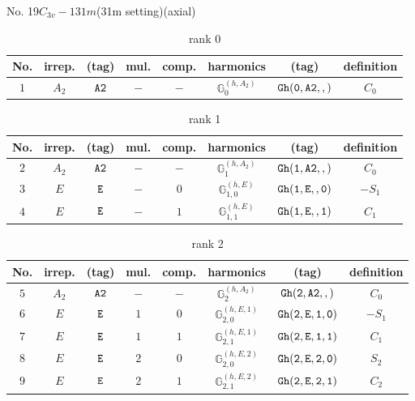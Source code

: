 \documentclass[fleqn,8pt]{jsarticle}
\begin{document}
\setcounter{MaxMatrixCols}{16}

\begin{center}
\LARGE
No. 19\quad$C_{3v}-1$\quad$31m$\quad(31m setting)\quad[ trigonal ] (axial)
\end{center}
\begin{table}[ht!]
\begin{center}
\caption{rank 0}
\renewcommand{\arraystretch}{1.3}
\begin{tabular}{cccccccc} \hline \hline
No. & irrep. & (tag) & mul. & comp. & harmonics & (tag) & definition \\ \hline
$ 1 $ & $ A_{2} $ & $ {\tt A2} $ & $ - $ & $ - $ & $ \mathbb{G}_{0}^{(h,A_{2})} $ & $ {\tt Gh(0,A2,,)} $ & $ C_{0} $ \\
 \hline \hline
\end{tabular}
\end{center}
\end{table}
\begin{table}[ht!]
\begin{center}
\caption{rank 1}
\renewcommand{\arraystretch}{1.3}
\begin{tabular}{cccccccc} \hline \hline
No. & irrep. & (tag) & mul. & comp. & harmonics & (tag) & definition \\ \hline
$ 2 $ & $ A_{2} $ & $ {\tt A2} $ & $ - $ & $ - $ & $ \mathbb{G}_{1}^{(h,A_{2})} $ & $ {\tt Gh(1,A2,,)} $ & $ C_{0} $ \\
$ 3 $ & $ E $ & $ {\tt E} $ & $ - $ & $ 0 $ & $ \mathbb{G}_{1,0}^{(h,E)} $ & $ {\tt Gh(1,E,,0)} $ & $ - S_{1} $ \\
$ 4 $ & $ E $ & $ {\tt E} $ & $ - $ & $ 1 $ & $ \mathbb{G}_{1,1}^{(h,E)} $ & $ {\tt Gh(1,E,,1)} $ & $ C_{1} $ \\
 \hline \hline
\end{tabular}
\end{center}
\end{table}
\begin{table}[ht!]
\begin{center}
\caption{rank 2}
\renewcommand{\arraystretch}{1.3}
\begin{tabular}{cccccccc} \hline \hline
No. & irrep. & (tag) & mul. & comp. & harmonics & (tag) & definition \\ \hline
$ 5 $ & $ A_{2} $ & $ {\tt A2} $ & $ - $ & $ - $ & $ \mathbb{G}_{2}^{(h,A_{2})} $ & $ {\tt Gh(2,A2,,)} $ & $ C_{0} $ \\
$ 6 $ & $ E $ & $ {\tt E} $ & $ 1 $ & $ 0 $ & $ \mathbb{G}_{2,0}^{(h,E,1)} $ & $ {\tt Gh(2,E,1,0)} $ & $ - S_{1} $ \\
$ 7 $ & $ E $ & $ {\tt E} $ & $ 1 $ & $ 1 $ & $ \mathbb{G}_{2,1}^{(h,E,1)} $ & $ {\tt Gh(2,E,1,1)} $ & $ C_{1} $ \\
$ 8 $ & $ E $ & $ {\tt E} $ & $ 2 $ & $ 0 $ & $ \mathbb{G}_{2,0}^{(h,E,2)} $ & $ {\tt Gh(2,E,2,0)} $ & $ S_{2} $ \\
$ 9 $ & $ E $ & $ {\tt E} $ & $ 2 $ & $ 1 $ & $ \mathbb{G}_{2,1}^{(h,E,2)} $ & $ {\tt Gh(2,E,2,1)} $ & $ C_{2} $ \\
 \hline \hline
\end{tabular}
\end{center}
\end{table}
\end{document}
